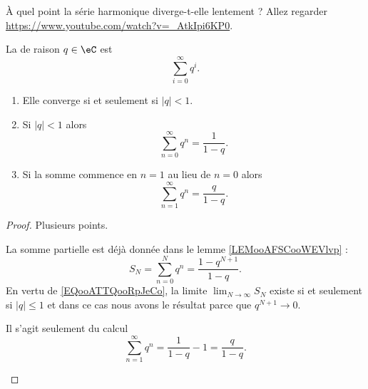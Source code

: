 \begin{normaltext}
	À quel point la série harmonique diverge-t-elle lentement ? Allez regarder\\ \url{https://www.youtube.com/watch?v=_AtkIpi6KP0}.
\end{normaltext}

\begin{propositionDef}      \label{PROPooWOWQooWbzukS}
	La  de raison \( q \in \eC\) est
	\begin{equation}    \label{EqZQTGooIWEFxL}
		\sum_{i=0}^\infty q^i.
	\end{equation}
	\begin{enumerate}
		\item       \label{ITEMooAFAMooGuXqBm}
		      Elle converge si et seulement si \( | q |<1\).
		\item       \label{ITEMooBJHBooBMEmiG}
		      Si \( | q |<1\) alors
		      \begin{equation}    \label{EqRGkBhrX}
			      \sum_{n=0}^{\infty}q^n=\frac{ 1 }{ 1-q }.
		      \end{equation}
		\item       \label{ITEMooVZHKooNGpDkx}
		      Si la somme commence en \( n=1\) au lieu de \( n=0\) alors
		      \begin{equation}        \label{EqPZOWooMdSRvY}
			      \sum_{n=1}^{\infty}q^n=\frac{ q }{ 1-q }.
		      \end{equation}
	\end{enumerate}
\end{propositionDef}

\begin{proof}
	Plusieurs points.
	\begin{subproof}
		La somme partielle est déjà donnée dans le lemme \ref{LEMooAFSCooWEVlvp} :
		\begin{equation}
			S_N=\sum_{n=0}^Nq^n=\frac{ 1-q^{N+1} }{ 1-q }.
		\end{equation}
		En vertu de \eqref{EQooATTQooRpJeCo}, la limite \( \lim_{N\to \infty} S_N\) existe si et seulement si \( | q |\leq 1\) et dans ce cas nous avons le résultat parce que \( q^{N+1}\to 0\).

		Il s'agit seulement du calcul
		\begin{equation}
			\sum_{n=1}^{\infty}q^n=\frac{1}{ 1-q }-1=\frac{ q }{ 1-q }.
		\end{equation}
	\end{subproof}
\end{proof}

